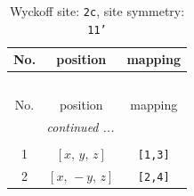 \documentclass[fleqn,8pt]{jsarticle}
\begin{document}
\begin{longtable}{ccc}
\caption{Wyckoff site: {\tt 2c}, site symmetry: {\tt 11'}}
 \\
 \hline \hline
No. & position & mapping \\ \hline \endfirsthead

\multicolumn{2}{l}{\tablename\ \thetable{}} \\
 \hline \hline
No. & position & mapping \\ \hline \endhead

 \hline \hline
\multicolumn{2}{r}{\footnotesize\it continued ...} \\ \endfoot

 \hline \hline
\multicolumn{2}{r}{} \\ \endlastfoot

1 & $\left[ x,\, y,\, z \right]$ & {\tt [1,3]} \\ \hline
2 & $\left[ x,\, - y,\, z \right]$ & {\tt [2,4]} \\
\end{longtable}
\end{document}
